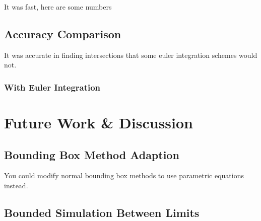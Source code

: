 	It was fast, here are some numbers

	\subsection{Accuracy Comparison}

	It was accurate in finding intersections that some euler integration schemes would not.

		\subsubsection{With Euler Integration}

\section{Future Work \& Discussion}

	\subsection{Bounding Box Method Adaption}

	You could modify normal bounding box methods to use parametric equations instead.

	\subsection{Bounded Simulation Between Limits}


